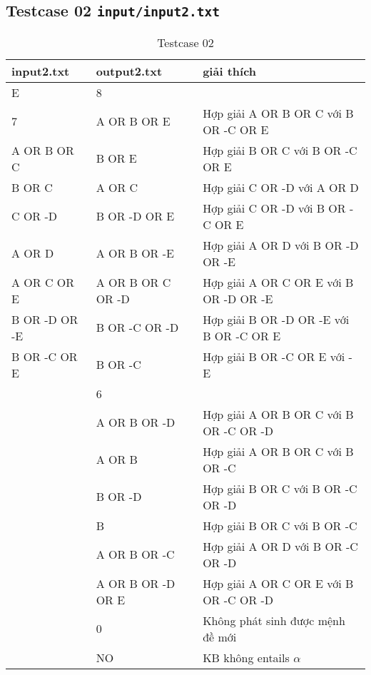 \documentclass[12pt]{article}
\begin{document}
\subsection{Testcase 02 \texttt{input/input2.txt}}
\begin{table}[H]
    \centering
    \begin{tabular}{|l|l|l|}
        \hline
        input2.txt & output2.txt & giải thích  \\
        \hline
        E & 8 & \\
        7 & A OR B OR E & Hợp giải A OR B OR C với B OR -C OR E \\
        A OR B OR C & B OR E & Hợp giải B OR C với B OR -C OR E \\
        B OR C & A OR C & Hợp giải C OR -D với A OR D \\
        C OR -D & B OR -D OR E & Hợp giải C OR -D với B OR -C OR E \\
        A OR D & A OR B OR -E & Hợp giải A OR D với B OR -D OR -E \\
        A OR C OR E & A OR B OR C OR -D & Hợp giải A OR C OR E với B OR -D OR -E \\
        B OR -D OR -E & B OR -C OR -D & Hợp giải B OR -D OR -E với B OR -C OR E \\
        B OR -C OR E & B OR -C & Hợp giải B OR -C OR E với -E \\
         & 6 & \\
         & A OR B OR -D & Hợp giải A OR B OR C với B OR -C OR -D \\
         & A OR B & Hợp giải A OR B OR C với B OR -C \\
         & B OR -D & Hợp giải B OR C với B OR -C OR -D \\
         & B & Hợp giải B OR C với B OR -C \\
         & A OR B OR -C & Hợp giải A OR D với B OR -C OR -D \\
         & A OR B OR -D OR E & Hợp giải A OR C OR E với B OR -C OR -D \\
         & 0 & Không phát sinh được mệnh đề mới \\
         & NO & KB không entails $\alpha$ \\
        \hline
    \end{tabular}
    \caption{Testcase 02}
\end{table}
\end{document}
